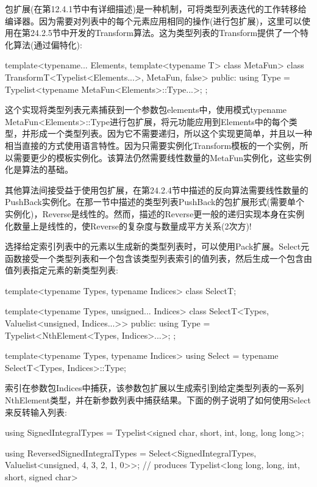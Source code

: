 包扩展(在第12.4.1节中有详细描述)是一种机制，可将类型列表迭代的工作转移给编译器。因为需要对列表中的每个元素应用相同的操作(进行包扩展)，这里可以使用在第24.2.5节中开发的Transform算法。这为类型列表的Transform提供了一个特化算法(通过偏特化):

\begin{cpp}
template<typename... Elements, template<typename T> class MetaFun>
class TransformT<Typelist<Elements...>, MetaFun, false>
{
	public:
	using Type = Typelist<typename MetaFun<Elements>::Type...>;
};
\end{cpp}

这个实现将类型列表元素捕获到一个参数包elements中，使用模式typename MetaFun<Elements>::Type进行包扩展，将元功能应用到Elements中的每个类型，并形成一个类型列表。因为它不需要递归，所以这个实现更简单，并且以一种相当直接的方式使用语言特性。因为只需要实例化Transform模板的一个实例，所以需要更少的模板实例化。该算法仍然需要线性数量的MetaFun实例化，这些实例化是算法的基础。

其他算法间接受益于使用包扩展，在第24.2.4节中描述的反向算法需要线性数量的PushBack实例化。在那一节中描述的类型列表PushBack的包扩展形式(需要单个实例化)，Reverse是线性的。然而，描述的Reverse更一般的递归实现本身在实例化数量上是线性的，使Reverse的复杂度与数量成平方关系(2次方)!

选择给定索引列表中的元素以生成新的类型列表时，可以使用Pack扩展。Select元函数接受一个类型列表和一个包含该类型列表索引的值列表，然后生成一个包含由值列表指定元素的新类型列表:

\begin{cpp}
template<typename Types, typename Indices>
class SelectT;

template<typename Types, unsigned... Indices>
class SelectT<Types, Valuelist<unsigned, Indices...>>
{
	public:
	using Type = Typelist<NthElement<Types, Indices>...>;
};

template<typename Types, typename Indices>
using Select = typename SelectT<Types, Indices>::Type;
\end{cpp}

索引在参数包Indices中捕获，该参数包扩展以生成索引到给定类型列表的一系列NthElement类型，并在新参数列表中捕获结果。下面的例子说明了如何使用Select来反转输入列表:

\begin{cpp}
using SignedIntegralTypes =
	Typelist<signed char, short, int, long, long long>;

using ReversedSignedIntegralTypes =
	Select<SignedIntegralTypes, Valuelist<unsigned, 4, 3, 2, 1, 0>>;
	// produces Typelist<long long, long, int, short, signed char>
\end{cpp}

